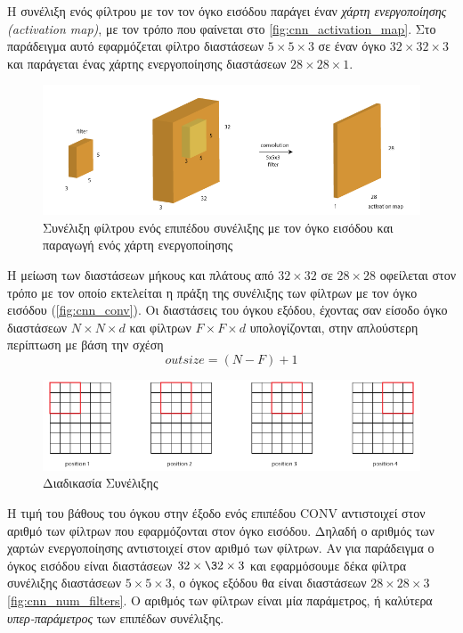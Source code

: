 Η συνέλιξη ενός φίλτρου με τον τον όγκο εισόδου παράγει έναν \emph{χάρτη ενεργοποίησης (activation map)},
με τον τρόπο που φαίνεται στο \autoref{fig:cnn_activation_map}. Στο παράδειγμα αυτό
εφαρμόζεται φίλτρο διαστάσεων $5\times5\times3$ σε έναν όγκο $32\times32\times3$ και παράγεται
ένας χάρτης ενεργοποίησης διαστάσεων $28\times28\times1$.

\begin{figure}[!ht]
  \centering
  \includegraphics[width=1\textwidth]{./images/chapter3/cnn_activation_map.png}
  \caption[Συνέλιξη φίλτρου ενός επιπέδου συνέλιξης με τον όγκο εισόδου και παραγωγή ενός χάρτη ενεργοποίησης]{Συνέλιξη φίλτρου ενός επιπέδου συνέλιξης με τον όγκο εισόδου και παραγωγή ενός χάρτη ενεργοποίησης}
  \label{fig:cnn_activation_map}
\end{figure}

Η μείωση των διαστάσεων μήκους και πλάτους από $32\times32$ σε $28\times28$ οφείλεται στον τρόπο με τον οποίο
εκτελείται η πράξη της συνέλιξης των φίλτρων με τον όγκο εισόδου  (\autoref{fig:cnn_conv}).
Οι διαστάσεις του όγκου εξόδου, έχοντας σαν είσοδο όγκο διαστάσεων $N \times N \times d$ και φίλτρων $F \times F \times d$ υπολογίζονται, στην απλούστερη περίπτωση με βάση την σχέση
\begin{equation*}
  outsize = (N-F) + 1
\end{equation*}


\begin{figure}[!ht]
  \centering
  \includegraphics[width=1\textwidth]{./images/chapter3/cnn_conv.png}
  \caption[Διαδικασία Συνέλιξης]{Διαδικασία Συνέλιξης}
  \label{fig:cnn_conv}
\end{figure}

Η τιμή του βάθους του όγκου στην έξοδο ενός επιπέδου CONV αντιστοιχεί στον αριθμό των φίλτρων που
εφαρμόζονται στον όγκο εισόδου. Δηλαδή ο αριθμός των χαρτών ενεργοποίησης
αντιστοιχεί στον αριθμό των φίλτρων. Αν για παράδειγμα ο όγκος εισόδου είναι
διαστάσεων $32\times\32\times3$ και εφαρμόσουμε δέκα φίλτρα συνέλιξης διαστάσεων $5\times5\times3$,
ο όγκος εξόδου θα είναι διαστάσεων $28\times28\times3$ \autoref{fig:cnn_num_filters}.
Ο αριθμός των φίλτρων είναι μία παράμετρος, ή καλύτερα \emph{υπερ-παράμετρος} των επιπέδων συνέλιξης.

